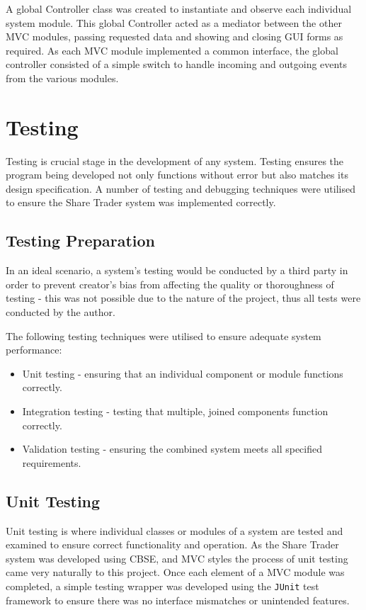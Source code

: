 \documentclass[12pt, a4paper,titlepage]{article}
\begin{document}
A global Controller class was created to instantiate and observe each
individual system module. 
This global Controller acted as a mediator between the other MVC modules,
passing requested data and showing and closing GUI forms as required.  
As each MVC module implemented a common interface, the global controller
consisted of a simple switch to handle incoming and outgoing events from the
various modules.


\section{Testing}
Testing is crucial stage in the development of any system.
Testing ensures the program being developed not only functions without error
but also matches its design specification. 
A number of testing and debugging techniques were utilised to ensure the Share
Trader system was implemented correctly.

\subsection{Testing Preparation}
In an ideal scenario, a system’s testing would be conducted by a third party
in order to prevent creator's bias from affecting the quality or thoroughness
of testing - this was not possible due to the nature of the project, thus all
tests were conducted by the author.

The following testing techniques were utilised to ensure adequate system
performance:
\begin{itemize}
    \item Unit testing - ensuring that an individual component or module
    functions correctly.
    \item Integration testing - testing that multiple, joined components
    function correctly.
    \item Validation testing - ensuring the combined system meets all
    specified requirements.
\end{itemize}

\subsection{Unit Testing}
Unit testing is where individual classes or modules of a system are tested and
examined to ensure correct functionality and operation. 
As the Share Trader system was developed using CBSE, and MVC styles the
process of unit testing came very naturally to this project.  
Once each element of a MVC module was completed, a simple testing wrapper was
developed  using the {\tt JUnit} test framework to ensure there was no interface
mismatches or unintended features.
\end{document}
